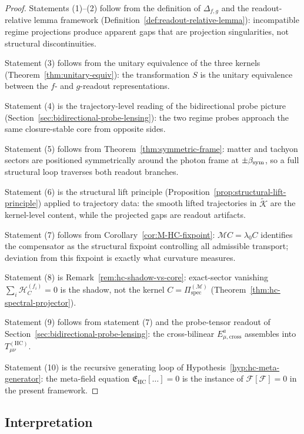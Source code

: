 \begin{proof}
Statements (1)--(2) follow from the definition of $\Delta_{f,g}$ and
the readout-relative lemma framework
(Definition~\ref{def:readout-relative-lemma}): incompatible regime
projections produce apparent gaps that are projection singularities,
not structural discontinuities.

Statement (3) follows from the unitary equivalence of the three kernels
(Theorem~\ref{thm:unitary-equiv}): the transformation $S$ is the
unitary equivalence between the $f$- and $g$-readout representations.

Statement (4) is the trajectory-level reading of the bidirectional
probe picture (Section~\ref{sec:bidirectional-probe-lensing}): the two
regime probes approach the same closure-stable core from opposite sides.

Statement (5) follows from Theorem~\ref{thm:symmetric-frame}: matter
and tachyon sectors are positioned symmetrically around the photon frame
at $\pm\beta_{\mathrm{sym}}$, so a full structural loop traverses both readout
branches.

Statement (6) is the structural lift principle
(Proposition~\ref{prop:structural-lift-principle}) applied to
trajectory data: the smooth lifted trajectories in $\tilde{\mathcal{K}}$
are the kernel-level content, while the projected gaps are readout
artifacts.

Statement (7) follows from Corollary~\ref{cor:M-HC-fixpoint}:
$\mathcal{M}C = \lambda_0 C$ identifies the compensator as the
structural fixpoint controlling all admissible transport; deviation
from this fixpoint is exactly what curvature measures.

Statement (8) is Remark~\ref{rem:hc-shadow-vs-core}: exact-sector
vanishing $\sum_i \mathcal{H}_C^{(f_i)} = 0$ is the shadow, not the
kernel $C = \Pi^{(\mathcal{M})}_{\mathrm{spec}}$
(Theorem~\ref{thm:hc-spectral-projector}).

Statement (9) follows from statement (7) and the probe-tensor readout
of Section~\ref{sec:bidirectional-probe-lensing}: the cross-bilinear
$E^a_{\mu,\mathrm{cross}}$ assembles into $T_{\mu\nu}^{(\mathrm{HC})}$.

Statement (10) is the recursive generating loop of
Hypothesis~\ref{hyp:hc-meta-generator}: the meta-field equation
$\mathfrak{E}_{\mathrm{HC}}[\ldots] = 0$ is the instance of
$\mathcal{F}[\mathcal{F}] = 0$ in the present framework.
\end{proof}

\subsection*{Interpretation}

